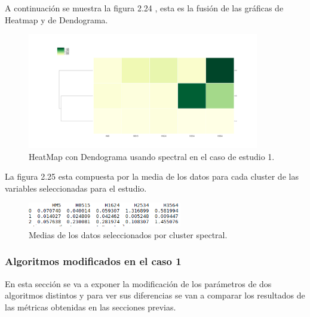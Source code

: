 	A continuación se muestra la figura 2.24 , esta es la fusión de las gráficas de 
	Heatmap y de Dendograma.  \\

	\begin{figure}[htb]
		\centering
		\includegraphics[width=0.9\textwidth]{./imagenes/caso1/heatmapcondendograma_caso1_spectral}
		\caption{HeatMap con Dendograma usando spectral en el caso de estudio 1.} \label{fig:1}
	\end{figure}

	La figura 2.25 esta compuesta por la media de los datos para cada cluster de las variables seleccionadas
	para el estudio. \\ 

	\begin{figure}[htb]
		\centering
		\includegraphics[width=0.6\textwidth]{./imagenes/caso1/medias_datos_caso1_spectral}
		\caption{Medias de los datos seleccionados por cluster spectral.} \label{fig:1}
	\end{figure}


	\subsubsection[Algoritmos modificados en el caso 1]{Algoritmos modificados en el caso 1}

	En esta sección se va a exponer la modificación de los parámetros de dos algoritmos distintos y para ver sus diferencias
	se van a comparar los resultados de las métricas obtenidas en las secciones previas. \\

